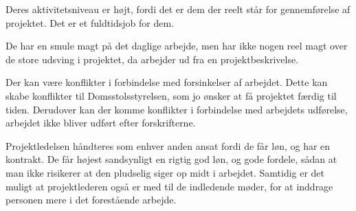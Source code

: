 \documentclass[10pt,a4paper,danish]{article}
\begin{document}
Deres aktivitetsniveau er højt, fordi det er dem der reelt står for gennemførelse af projektet. Det er et fuldtidsjob for dem.

De har en smule magt på det daglige arbejde, men har ikke nogen reel magt over de store udsving i projektet, da arbejder ud fra en projektbeskrivelse.

Der kan være konflikter i forbindelse med forsinkelser af arbejdet. Dette kan skabe konflikter til Domsstolsstyrelsen, som jo ønsker at få projektet færdig til tiden. Derudover kan der komme konflikter i forbindelse med arbejdets udførelse, arbejdet ikke bliver udført efter forskrifterne.

Projektledelsen håndteres som enhver anden ansat fordi de får løn, og har en kontrakt. De får højest sandsynligt en rigtig god løn, og gode fordele, sådan at man ikke risikerer at den pludselig siger op midt i arbejdet. Samtidig er det muligt at projektlederen også er med til de indledende møder, for at inddrage personen mere i det forestående arbejde.
\end{document}
